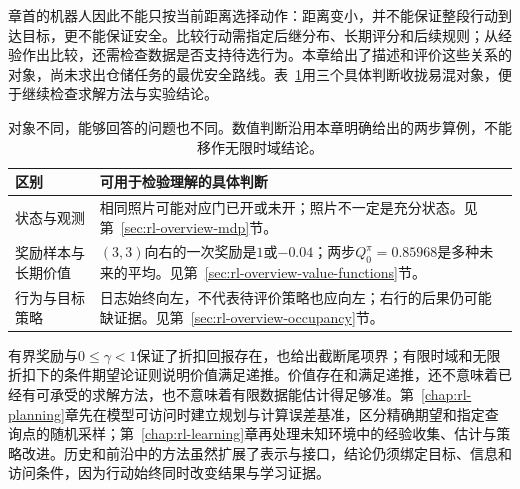 章首的机器人因此不能只按当前距离选择动作：距离变小，并不能保证整段行动到达目标，更不能保证安全。比较行动需指定后继分布、长期评分和后续规则；从经验作出比较，还需检查数据是否支持待选行为。本章给出了描述和评价这些关系的对象，尚未求出仓储任务的最优安全路线。表~\ref{tab:rl-overview-distinctions}用三个具体判断收拢易混对象，便于继续检查求解方法与实验结论。

\begin{table}[htbp]
  \centering\small
  \begin{tabularx}{\linewidth}{@{}>{\raggedright\arraybackslash}p{25mm}>{\raggedright\arraybackslash}X@{}}
    \toprule
    区别 & 可用于检验理解的具体判断\\
    \midrule
    状态与观测 & 相同照片可能对应门已开或未开；照片不一定是充分状态。见第~\ref{sec:rl-overview-mdp}节。\\
    奖励样本与长期价值 & $(3,3)$向右的一次奖励是$1$或$-0.04$；两步$Q_0^\pi=0.85968$是多种未来的平均。见第~\ref{sec:rl-overview-value-functions}节。\\
    行为与目标策略 & 日志始终向左，不代表待评价策略也应向左；右行的后果仍可能缺证据。见第~\ref{sec:rl-overview-occupancy}节。\\
    \bottomrule
  \end{tabularx}
  \caption{对象不同，能够回答的问题也不同。数值判断沿用本章明确给出的两步算例，不能移作无限时域结论。}
  \label{tab:rl-overview-distinctions}
\end{table}

有界奖励与$0\leq\gamma<1$保证了折扣回报存在，也给出截断尾项界；有限时域和无限折扣下的条件期望论证则说明价值满足递推。价值存在和满足递推，还不意味着已经有可承受的求解方法，也不意味着有限数据能估计得足够准。第~\ref{chap:rl-planning}章先在模型可访问时建立规划与计算误差基准，区分精确期望和指定查询点的随机采样；第~\ref{chap:rl-learning}章再处理未知环境中的经验收集、估计与策略改进。历史和前沿中的方法虽然扩展了表示与接口，结论仍须绑定目标、信息和访问条件，因为行动始终同时改变结果与学习证据。
